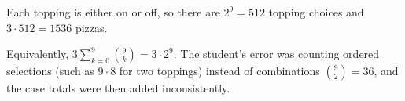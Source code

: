 Each topping is either on or off, so there are $2^9=512$ topping choices and $3\cdot512=\boxed{1536}$ pizzas.

Equivalently, $3\sum_{k=0}^{9}\binom9k=3\cdot2^9$. The student's error was counting ordered selections (such as $9\cdot8$ for two toppings) instead of combinations $\binom92=36$, and the case totals were then added inconsistently.
